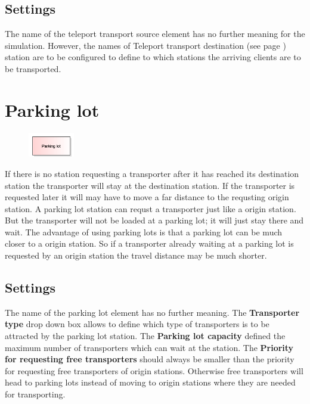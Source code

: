 \subsection*{Settings}

The name of the teleport transport source element has no further meaning for the simulation.
However, the names of Teleport transport destination (see page \pageref{ref:ModelElementTeleportDestination}) 
station are to be configured to define to which stations the arriving clients are to be transported.


\section{Parking lot}
\label{ref:ModelElementTransportParking}

\begin{figure}
\vspace{-22pt}
\includegraphics[width=2cm]{imageModelElementTransportParking.png}
\vspace{-22pt}
\end{figure}

If there is no station requesting a transporter after it has reached its
destination station the transporter will stay at the destination station. 
If the transporter is requested later it will may have to move a far distance
to the requsting origin station. A parking lot station can requst a transporter
just like a origin station. But the transporter will not be loaded at a parking lot;
it will just stay there and wait. The advantage of using parking lots is that
a parking lot can be much closer to a origin station. So if a transporter
already waiting at a parking lot is requested by an origin station the
travel distance may be much shorter.

\subsection*{Settings}

The name of the parking lot element has no further meaning.
The \textbf{Transporter type} drop down box allows to define which
type of transporters is to be attracted by the parking lot station.
The \textbf{Parking lot capacity} defined the maximum number of
transporters which can wait at the station. The
\textbf{Priority for requesting free transporters} should always be
smaller than the priority for requesting free transporters of
origin stations. Otherwise free transporters will head to parking
lots instead of moving to origin stations where they are needed
for transporting.


